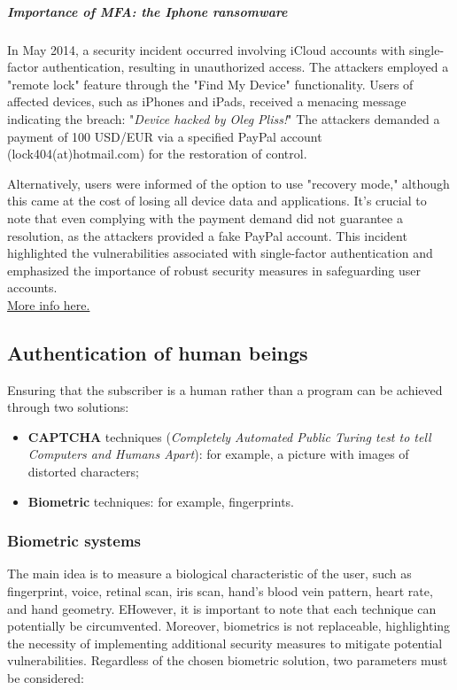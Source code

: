 \subparagraph{Importance of MFA: the Iphone ransomware}
In May 2014, a security incident occurred involving iCloud accounts with single-factor authentication, resulting in unauthorized access.
The attackers employed a "remote lock" feature through the "Find My Device" functionality. Users of affected devices, such as iPhones and iPads, received a menacing message indicating the breach: "\textit{Device hacked by Oleg Pliss!}"
The attackers demanded a payment of 100 USD/EUR via a specified PayPal account (lock404(at)hotmail.com) for the restoration of control.

Alternatively, users were informed of the option to use "recovery mode," although this came at the cost of losing all device data and applications. It's crucial to note that even complying with the payment demand did not guarantee a resolution, as the attackers provided a fake PayPal account.
This incident highlighted the vulnerabilities associated with single-factor authentication and emphasized the importance of robust security measures in safeguarding user accounts.\\
\href{http://thehackernews.com/2014/05/apple-devices-hacked-by-oleg-pliss-held.html}{More info here.}

\subsection{Authentication of human beings}
Ensuring that the subscriber is a human rather than a program can be achieved through two solutions:
\begin{itemize}
	\item \textbf{CAPTCHA} techniques (\textit{Completely Automated Public Turing test to tell Computers and Humans
		      Apart}): for example, a picture with images of distorted characters;
	\item \textbf{Biometric} techniques: for example, fingerprints.
\end{itemize}


\subsubsection{Biometric systems}
The main idea is to measure a biological characteristic of the user, such as fingerprint, voice, retinal scan, iris scan, hand's blood vein pattern, heart rate, and hand geometry.
EHowever, it is important to note that each technique can potentially be circumvented. Moreover, biometrics is not replaceable, highlighting the necessity of implementing additional security measures to mitigate potential vulnerabilities.
Regardless of the chosen biometric solution, two parameters must be considered:

